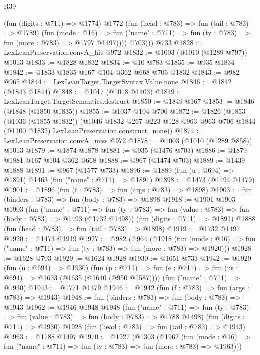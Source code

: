 \begin{lexlean}{R39}
\begin{coremodule}
              (fun (digits : @711) => @1774)
              @1772
              (fun (head : @783) => fun (tail : @783) => @1789)
              (fun (mode : @16) =>
              fun ("name" : @711) => fun (ty : @783) => fun (more : @783) => @1797 @1497))))
          @703)))
    @733
@1828 := LexLeanPreservation.convA_hit @972
@1832 := @1003 (@1010 (@1289 @797)) @1013
@1833 := @1828 @1832
@1834 := @10 @783
@1835 := @935 @1834
@1842 := @1833 @1835 @167 @104 @362 @668 @706 @1832
@1843 := @982 @965
@1844 := LexLeanTarget.TargetSyntax.Value.none
@1846 := @1842 (@1843 @1844)
@1848 := @1017 (@1018 @1403)
@1849 := LexLeanTarget.TargetSemantics.destruct
@1850 := @1849 @167
@1853 := @1846 (@1848 (@1850 @1835))
@1855 := @1037 @104 @706
@1872 := @1826
    (@1853
      (@1036 (@1855 @1832))
      (@1046
        @1832
        @267
        @223
        @128
        @963
        @963
        @706
        @1844
        (@1100 @1832)
        LexLeanPreservation.construct_none))
@1874 := LexLeanPreservation.convA_miss @972
@1878 := @1003 (@1010 (@1289 @858)) @1013
@1879 := @1874 @1878
@1881 := @935 (@1476 @703)
@1886 := @1879 @1881 @167 @104 @362 @668
@1888 := @967 (@1474 @703)
@1889 := @1439 @1888
@1891 := @967 (@1577 @733)
@1896 := @1889 (fun (u : @694) => @1891) @1463 (fun ("name" : @711) => @1891)
@1898 := @1473 (@1494 @1479)
@1901 := @1896 (fun (f : @783) => fun (args : @783) => @1898)
@1903 := fun (binders : @783) => fun (body : @783) => @1898
@1918 := @1901
    @1903
    @1903
    (fun ("name" : @711) =>
    fun (ty : @783) => fun (value : @783) => fun (body : @783) => @1493 (@1732 @1498))
    (fun (digits : @711) => @1891)
    @1888
    (fun (head : @783) => fun (tail : @783) => @1898)
@1919 := @1732 @1497
@1920 := @1473 @1919
@1927 := @982
    (@964
      (@1918
        (fun (mode : @16) => fun ("name" : @711) => fun (ty : @783) => fun (more : @783) => @1920)))
@1928 := @1628 @703
@1929 := @1624 @1928
@1930 := @1651 @733
@1942 := @1929
    (fun (u : @694) => @1930)
    (fun (p : @711) => fun (e : @711) => fun (us : @694) => @1633 (@1635 (@1640 (@950 @1587))))
    (fun ("name" : @711) => @1930)
@1943 := @1771 @1479
@1946 := @1942 (fun (f : @783) => fun (args : @783) => @1943)
@1948 := fun (binders : @783) => fun (body : @783) => @1943
@1962 := @1946
    @1948
    @1948
    (fun ("name" : @711) =>
    fun (ty : @783) => fun (value : @783) => fun (body : @783) => @1788 @1498)
    (fun (digits : @711) => @1930)
    @1928
    (fun (head : @783) => fun (tail : @783) => @1943)
@1963 := @1788 @1497
@1970 := @1927
    (@1303
      (@1962
        (fun (mode : @16) => fun ("name" : @711) => fun (ty : @783) => fun (more : @783) => @1963)))

\end{coremodule}
\end{lexlean}
